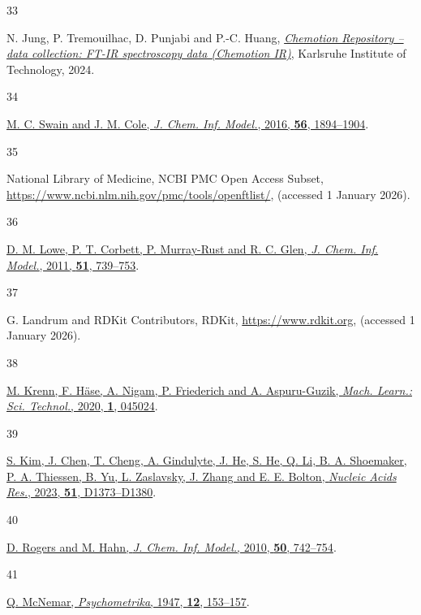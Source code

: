 \documentclass[
  10pt,
]{article}
\newlength{\cslhangindent}
\newlength{\csllabelwidth}
\newlength{\cslentryspacingunit} %
\newenvironment{CSLReferences}[2] %
 {%
  \setlength{\parindent}{0pt}
  \ifodd #1
  \let\oldpar\par
  \def\par{\hangindent=\cslhangindent\oldpar}
  \fi
  \setlength{\parskip}{#2\cslentryspacingunit}
 }%
 {}
\newcommand{\CSLLeftMargin}[1]{\parbox[t]{\csllabelwidth}{#1}}
\newcommand{\CSLRightInline}[1]{\parbox[t]{\linewidth - \csllabelwidth}{#1}\break}
\begin{document}
\begin{CSLReferences}{0}{0}
\leavevmode{}%
\CSLLeftMargin{33 }%
\CSLRightInline{N. Jung, P. Tremouilhac, D. Punjabi and P.-C. Huang,
\emph{\href{https://doi.org/10.22000/OGoEQGlsZGElrgst}{Chemotion
Repository -- data collection: FT-IR spectroscopy data (Chemotion IR)}},
Karlsruhe Institute of Technology, 2024.}

\leavevmode{}%
\CSLLeftMargin{34 }%
\CSLRightInline{\href{https://doi.org/10.1021/acs.jcim.6b00207}{M. C.
Swain and J. M. Cole, \emph{J. Chem. Inf. Model.}, 2016, \textbf{56},
1894--1904}.}

\leavevmode{}%
\CSLLeftMargin{35 }%
\CSLRightInline{National Library of Medicine, NCBI PMC Open Access
Subset, \url{https://www.ncbi.nlm.nih.gov/pmc/tools/openftlist/},
(accessed 1 January 2026).}

\leavevmode{}%
\CSLLeftMargin{36 }%
\CSLRightInline{\href{https://doi.org/10.1021/ci100384d}{D. M. Lowe, P.
T. Corbett, P. Murray-Rust and R. C. Glen, \emph{J. Chem. Inf. Model.},
2011, \textbf{51}, 739--753}.}

\leavevmode{}%
\CSLLeftMargin{37 }%
\CSLRightInline{G. Landrum and RDKit Contributors, RDKit,
\url{https://www.rdkit.org}, (accessed 1 January 2026).}

\leavevmode{}%
\CSLLeftMargin{38 }%
\CSLRightInline{\href{https://doi.org/10.1088/2632-2153/aba947}{M.
Krenn, F. Häse, A. Nigam, P. Friederich and A. Aspuru-Guzik, \emph{Mach.
Learn.: Sci. Technol.}, 2020, \textbf{1}, 045024}.}

\leavevmode{}%
\CSLLeftMargin{39 }%
\CSLRightInline{\href{https://doi.org/10.1093/nar/gkac956}{S. Kim, J.
Chen, T. Cheng, A. Gindulyte, J. He, S. He, Q. Li, B. A. Shoemaker, P.
A. Thiessen, B. Yu, L. Zaslavsky, J. Zhang and E. E. Bolton,
\emph{Nucleic Acids Res.}, 2023, \textbf{51}, D1373--D1380}.}

\leavevmode{}%
\CSLLeftMargin{40 }%
\CSLRightInline{\href{https://doi.org/10.1021/ci100050t}{D. Rogers and
M. Hahn, \emph{J. Chem. Inf. Model.}, 2010, \textbf{50}, 742--754}.}

\leavevmode{}%
\CSLLeftMargin{41 }%
\CSLRightInline{\href{https://doi.org/10.1007/BF02295996}{Q. McNemar,
\emph{Psychometrika}, 1947, \textbf{12}, 153--157}.}


\end{CSLReferences}
\end{document}
